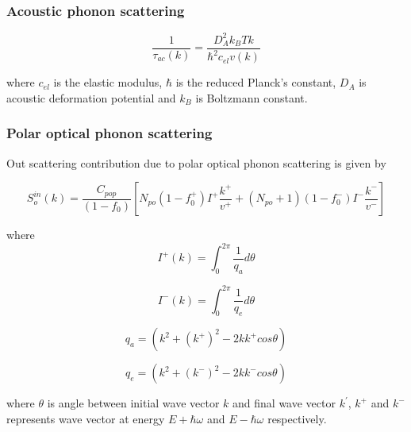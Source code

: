 \documentclass[12pt]{article}
\begin{document}
\subsubsection{Acoustic phonon scattering}

\cite{zha2016thermal}

\begin{equation}
\frac{1}{\tau_{ac}(k)} = \frac{D_{A}^2 k_{B} T k}{\hbar^2 c_{el} v(k)} 
\label{acoustic_rate}
\end{equation}

where $ c_{el} $ is the elastic modulus, $ \hbar $ is the reduced Planck's constant, $D_A$ is acoustic deformation potential and $ k_{B} $ is Boltzmann constant. 

\subsubsection{Polar optical phonon scattering}

Out scattering contribution due to polar optical phonon scattering is given by \cite{nag2012electron, kawamura1992phonon}

\begin{equation}
S_{o}^{in}(k) = \frac{C_{pop}}{(1- f_{0})} [N_{po} (1 - f_{0}^+) I^+ \frac{k^+}{v^+}  + (N_{po}+1) (1 - f_{0}^-) I^- \frac{k^-}{v^-}]
\label{out_sc_pop}
\end{equation}

where 
\begin{equation}
I^{+}(k) = \int_0^{2\pi} \frac{1}{q_{a}} d\theta 
\label{J_plus}
\end{equation}

\begin{equation}
I^{-}(k) = \int_0^{2\pi} \frac{1}{q_{e}} d\theta 
\label{J_plus}
\end{equation}



\begin{equation}
q_{a} = \left( k^2 + \left( k^{+}\right)^2 - 2k k^{+} cos \theta \right)
\label{q_ab}
\end{equation}

\begin{equation}
q_{e} = \left( k^2 + \left( k^{-}\right)^2 - 2k k^{-} cos \theta \right)
\label{q_em}
\end{equation}

where $\theta $ is angle between initial wave vector $k$ and final wave vector $k^{'}$, $k^+$ and $k^-$ represents wave vector at energy $E+ \hbar \omega$ and $E- \hbar \omega$ respectively.
\end{document}
